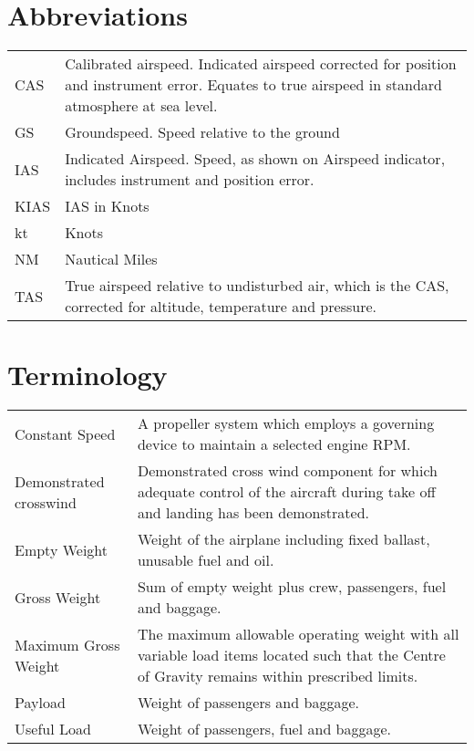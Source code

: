 \section{Abbreviations}
  \begin{tabularx}{\linewidth}{
    >{\hsize=0.2\hsize}X
    >{\hsize=0.8\hsize}X  }
CAS & Calibrated airspeed. Indicated airspeed corrected for position and instrument error. Equates to true airspeed in standard atmosphere at sea level. \\
GS & Groundspeed. Speed relative to the ground \\
IAS & Indicated Airspeed. Speed, as shown on Airspeed indicator, includes instrument and position error. \\
KIAS & IAS in Knots \\
kt & Knots \\
NM & Nautical Miles\\
TAS & True airspeed relative to undisturbed air, which is the CAS, corrected for altitude, temperature and pressure. \\
\end{tabularx}

\section{Terminology}
  \begin{tabularx}{\linewidth}{
    >{\hsize=0.2\hsize}X
    >{\hsize=0.8\hsize}X  }
Constant Speed & A propeller system which employs a governing device to maintain a selected engine RPM.\\
Demonstrated crosswind & Demonstrated cross wind component for which adequate control of the aircraft during take off and landing has been demonstrated.\\
Empty Weight & Weight of the airplane including fixed ballast, unusable fuel and oil.\\
Gross Weight & Sum of empty weight plus crew, passengers, fuel and baggage.  \\
Maximum Gross Weight & The maximum allowable operating weight with all variable load items located such that the Centre of Gravity remains within prescribed limits.\\
Payload & Weight of passengers and baggage.\\
Useful Load & Weight of passengers, fuel and baggage.\\
\end{tabularx}

